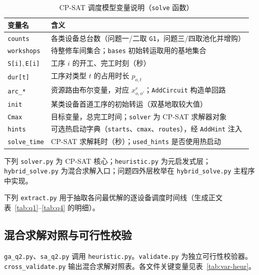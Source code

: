 \documentclass[12pt,a4paper]{ctexart}
\begin{document}
\begin{table}[H]
\centering
\caption{CP-SAT 调度模型变量说明（\texttt{solve} 函数）}\label{tab:var-model}
\begin{tabular}{p{3.0cm} p{11.5cm}}
\toprule
\textbf{变量名} & \textbf{含义} \\
\midrule
\texttt{counts} & 各类设备总台数（问题一/二取 \texttt{G1}，问题三/四取池化并增购） \\
\texttt{workshops} & 待整修车间集合；\texttt{bases} 初始转运取用的基地集合 \\
\texttt{S[i]},\,\texttt{E[i]} & 工序 $i$ 的开工、完工时刻（秒） \\
\texttt{dur[t]} & 工序对类型 $t$ 的占用时长 $p_{o,t}$ \\
\texttt{arc\_*} & 资源路由布尔变量，对应 $x^{r}_{o,o'}$；\texttt{AddCircuit} 构造单回路 \\
\texttt{init} & 某类设备首道工序的初始转运（双基地取较大值） \\
\texttt{Cmax} & 目标变量，总完工时间；\texttt{solver} 为 CP-SAT 求解器对象 \\
\texttt{hints} & 可选热启动字典（\texttt{starts}、\texttt{cmax}、\texttt{routes}），经 \texttt{AddHint} 注入 \\
\texttt{solve\_time} & CP-SAT 求解耗时（秒）；\texttt{used\_hints} 是否使用热启动 \\
\bottomrule
\end{tabular}
\end{table}

\noindent 下列 \texttt{solver.py} 为 CP-SAT 核心；\texttt{heuristic.py} 为元启发式层；\texttt{hybrid\_solve.py} 为混合求解入口；问题四外层枚举在 \texttt{hybrid\_solve.py} 主程序中实现。






\noindent 下列 \texttt{extract.py} 用于抽取各问最优解的逐设备调度时间线（生成正文表~\ref{tab:q1}--\ref{tab:q4} 的明细）。



\subsection*{混合求解对照与可行性校验}
\noindent\texttt{ga\_q2.py}、\texttt{sa\_q2.py} 调用 \texttt{heuristic.py}。\texttt{validate.py} 为独立可行性校验器。\texttt{cross\_validate.py} 输出混合求解对照表。各文件关键变量见表~\ref{tab:var-heur}。
\end{document}
